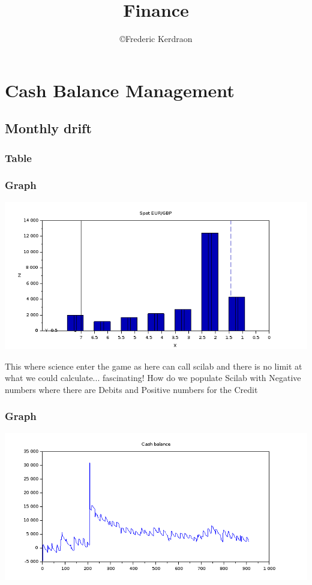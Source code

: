 \documentclass[8pt]{article} %
\title{Finance}
\author{\copyright Frederic Kerdraon}
\begin{document}
\maketitle
\tableofcontents

\section{Cash Balance Management}

\subsection{Monthly drift}

\subsubsection{Table}
%


\subsubsection{Graph}
\includegraphics[scale=0.6]{Vector.png}

This where science enter the game as here can call scilab and there is no limit at what we could calculate... fascinating!
How do we populate Scilab with Negative numbers where there are Debits and Positive numbers for the Credit
\subsubsection{Graph}
\includegraphics[scale=0.6]{../Maths/Scilab-cashBalance.png}
\end{document}
